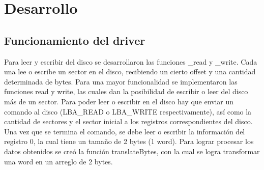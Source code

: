 \documentclass[a4paper,10pt]{article}
\begin{document}
\newpage


\section{Desarrollo}

\subsection{Funcionamiento del driver}
Para leer y escribir del disco se desarrollaron las funciones \_read y \_write. Cada 
una lee o escribe un sector en el disco, recibiendo un cierto offset y una cantidad determinada de bytes. 
Para una mayor funcionalidad se implementaron las funciones read y write,
las cuales dan la posibilidad de escribir o leer del disco más de un sector.
Para poder leer o escribir en el disco hay que enviar un comando al disco (LBA\_READ o LBA\_WRITE respectivamente), 
así como la cantidad de sectores y el sector inicial a los registros correspondientes del disco.
Una vez que se termina el comando, se debe leer o escribir la información del registro 0, la cual
tiene un tamaño de 2 bytes (1 word). Para lograr procesar los datos obtenidos se creó la función translateBytes, 
con la cual se logra transformar una word en un arreglo de 2 bytes.
\end{document}
